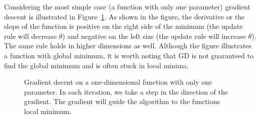 Considering the most simple case (a function with only one parameter) gradient descent is illustrated in Figure~\ref{fig:gradientD}. As shown in the figure, the derivative or the slope of the function is positive on the right side of the minimum (the update rule will decrease $\theta$) and negative on the left size (the update rule will increase $\theta$). The same rule holds in higher dimensions as well. Although the figure illustrates a function with global minimum, it is worth noting that GD is not guaranteed to find the global minimum and is often stuck in local minima.\\
%

\begin{figure}
\centering 
\resizebox{0.65\textwidth}{0.4\textwidth}{      

}
\caption{Gradient decent on a one-dimensional function with only one parameter.
In each iteration, we take a step in the direction of the gradient. The gradient will guide the algorithm to the functions local minimum.
}
\label{fig:gradientD}
\end{figure}
\noindent

